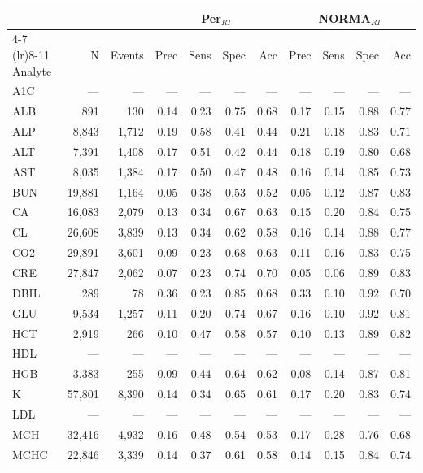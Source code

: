 \begin{table}[ht]
\centering
\footnotesize
\begin{tabular}{lrrrrrrrrrr}
\toprule
 & &  & \multicolumn{4}{c}{Per$_{RI}$} & \multicolumn{4}{c}{NORMA$_{RI}$} \\
\cmidrule(lr){4-7} \cmidrule(lr){8-11}
Analyte & N & Events & Prec & Sens & Spec & Acc & Prec & Sens & Spec & Acc \\
\midrule
A1C & --- & --- & --- & --- & --- & --- & --- & --- & --- & --- \\
ALB & 891 & 130 & 0.14 & 0.23 & 0.75 & 0.68 & 0.17 & 0.15 & 0.88 & 0.77 \\
ALP & 8,843 & 1,712 & 0.19 & 0.58 & 0.41 & 0.44 & 0.21 & 0.18 & 0.83 & 0.71 \\
ALT & 7,391 & 1,408 & 0.17 & 0.51 & 0.42 & 0.44 & 0.18 & 0.19 & 0.80 & 0.68 \\
AST & 8,035 & 1,384 & 0.17 & 0.50 & 0.47 & 0.48 & 0.16 & 0.14 & 0.85 & 0.73 \\
BUN & 19,881 & 1,164 & 0.05 & 0.38 & 0.53 & 0.52 & 0.05 & 0.12 & 0.87 & 0.83 \\
CA & 16,083 & 2,079 & 0.13 & 0.34 & 0.67 & 0.63 & 0.15 & 0.20 & 0.84 & 0.75 \\
CL & 26,608 & 3,839 & 0.13 & 0.34 & 0.62 & 0.58 & 0.16 & 0.14 & 0.88 & 0.77 \\
CO2 & 29,891 & 3,601 & 0.09 & 0.23 & 0.68 & 0.63 & 0.11 & 0.16 & 0.83 & 0.75 \\
CRE & 27,847 & 2,062 & 0.07 & 0.23 & 0.74 & 0.70 & 0.05 & 0.06 & 0.89 & 0.83 \\
DBIL & 289 & 78 & 0.36 & 0.23 & 0.85 & 0.68 & 0.33 & 0.10 & 0.92 & 0.70 \\
GLU & 9,534 & 1,257 & 0.11 & 0.20 & 0.74 & 0.67 & 0.16 & 0.10 & 0.92 & 0.81 \\
HCT & 2,919 & 266 & 0.10 & 0.47 & 0.58 & 0.57 & 0.10 & 0.13 & 0.89 & 0.82 \\
HDL & --- & --- & --- & --- & --- & --- & --- & --- & --- & --- \\
HGB & 3,383 & 255 & 0.09 & 0.44 & 0.64 & 0.62 & 0.08 & 0.14 & 0.87 & 0.81 \\
K & 57,801 & 8,390 & 0.14 & 0.34 & 0.65 & 0.61 & 0.17 & 0.20 & 0.83 & 0.74 \\
LDL & --- & --- & --- & --- & --- & --- & --- & --- & --- & --- \\
MCH & 32,416 & 4,932 & 0.16 & 0.48 & 0.54 & 0.53 & 0.17 & 0.28 & 0.76 & 0.68 \\
MCHC & 22,846 & 3,339 & 0.14 & 0.37 & 0.61 & 0.58 & 0.14 & 0.15 & 0.84 & 0.74 \\

\end{tabular}
\end{table}
